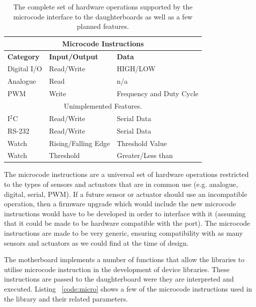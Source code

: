 	\begin{table}[h] 
        \centering
          \scriptsize {%
	      \begin{tabular}{|l|l|l|}
            \toprule
	        \multicolumn{3}{c}{\textbf{Microcode Instructions}} \\\hline
            \textbf{Category} & \textbf{Input/Output} & \textbf{Data}\\\hline
            Digital I/O  & Read/Write & HIGH/LOW \\\hline
            Analogue & Read & n/a \\\hline
            PWM & Write & Frequency and Duty Cycle \\\hline
            \multicolumn{3}{c}{Unimplemented Features.} \\\hline
            I$^{2}$C & Read/Write & Serial Data \\\hline 
            RS-232 & Read/Write & Serial Data \\\hline 
            Watch & Rising/Falling Edge & Threshold Value\\\hline 
            Watch & Threshold & Greater/Less than\\\hline 
            \end{tabular} 
            }
	  \caption{The complete set of hardware operations supported by the
	    microcode interface to the daughterboards as well as a few planned features.}
	  \label{tab:microcode}
	\end{table}
	\normalsize
	
 The microcode instructions are a universal set of hardware operations restricted to the types of sensors and actuators that are in common use (e.g. analogue, digital, serial, PWM). If a future sensor or actuator should use an incompatible operation, then a firmware upgrade which would include the new microcode instructions would have to be developed in order to interface with it (assuming that it could be made to be hardware compatible with the port). The microcode instructions are made to be very generic, ensuring compatibility with as many sensors and actuators as we could find at the time of design.

	
	The motherboard implements a number of functions that allow the libraries to utilise microcode instruction in the development of device libraries. These instructions are passed to the daughterboard were they are interpreted and executed. Listing ~\ref{code:micro} shows a few of the microcode instructions used in the \xten library and their related parameters.
	
